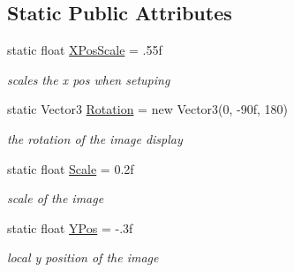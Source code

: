 \subsection*{Static Public Attributes}
\begin{DoxyCompactItemize}
\item 
static float \mbox{\hyperlink{class_image_display_ae1044419b2f9dfa64d75329e48e312de}{X\+Pos\+Scale}} = .\+55f
\begin{DoxyCompactList}\small\item\em scales the x pos when setuping \end{DoxyCompactList}\item 
static Vector3 \mbox{\hyperlink{class_image_display_a8ecd7f162065170c3f5cbcf906b11873}{Rotation}} = new Vector3(0, -\/90f, 180)
\begin{DoxyCompactList}\small\item\em the rotation of the image display \end{DoxyCompactList}\item 
static float \mbox{\hyperlink{class_image_display_aac7ba9a36c272ad5c6873119b521ed5e}{Scale}} = 0.\+2f
\begin{DoxyCompactList}\small\item\em scale of the image \end{DoxyCompactList}\item 
static float \mbox{\hyperlink{class_image_display_ac0ef458ef2e417549068a631e35f39d6}{Y\+Pos}} = -\/.\+3f
\begin{DoxyCompactList}\small\item\em local y position of the image \end{DoxyCompactList}\end{DoxyCompactItemize}

